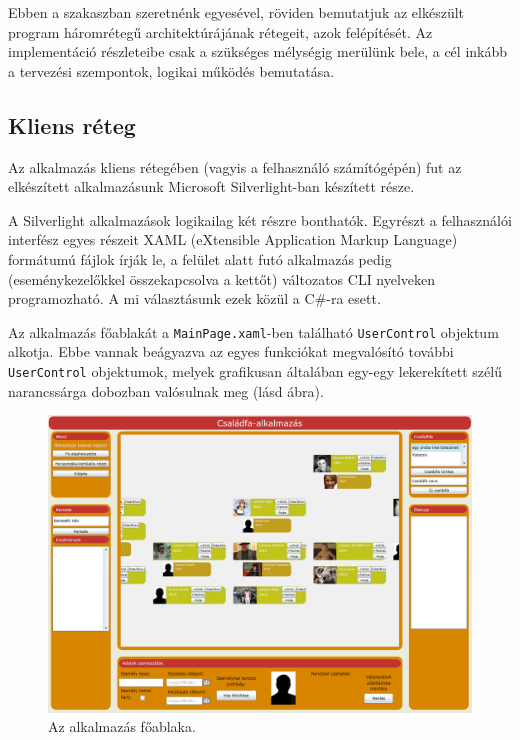 Ebben a szakaszban szeretnénk egyesével, röviden bemutatjuk az elkészült program háromrétegű architektúrájának rétegeit, azok felépítését. Az implementáció részleteibe csak a szükséges mélységig merülünk bele, a cél inkább a tervezési szempontok, logikai működés bemutatása.

\subsection{Kliens réteg}\label{sect:kliens_reteg}

Az alkalmazás kliens rétegében (vagyis a felhasználó számítógépén) fut az elkészített alkalmazásunk Microsoft Silverlight-ban készített része.

A Silverlight alkalmazások logikailag két részre bonthatók. Egyrészt a felhasználói interfész egyes részeit XAML (eXtensible Application Markup Language) formátumú fájlok írják le, a felület alatt futó alkalmazás pedig (eseménykezelőkkel összekapcsolva a kettőt) változatos CLI nyelveken programozható. A mi választásunk ezek közül a C\#-ra esett.

\bigskip

Az alkalmazás főablakát a \texttt{MainPage.xaml}-ben található \texttt{UserControl} objektum alkotja. Ebbe vannak beágyazva az egyes funkciókat megvalósító további \texttt{UserControl} objektumok, melyek grafikusan általában egy-egy lekerekített szélű narancssárga dobozban valósulnak meg (lásd  ábra).

\begin{figure}[!ht]
\centering
\includegraphics[width=130mm, keepaspectratio]{figures/felulet.png}
\caption{Az alkalmazás főablaka.}
\label{fig:alk_felulet}
\end{figure}

